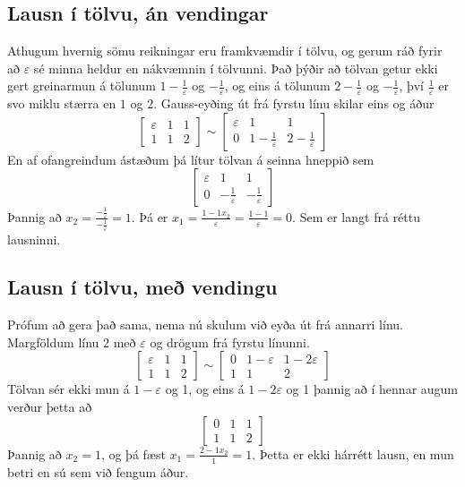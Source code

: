 \documentclass[14pt,a4paper]{article}
\renewcommand{\epsilon}{\varepsilon}
\begin{document}
\subsection*{Lausn í tölvu, án vendingar}
Athugum hvernig sömu reikningar eru framkvæmdir í tölvu, og gerum ráð 
fyrir að $\epsilon$ sé minna heldur en nákvæmnin í tölvunni. Það þýðir að tölvan
getur ekki gert greinarmun á tölunum $1-\frac 1\epsilon$ og $-\frac 1\epsilon$, og eins á 
tölunum $2-\frac 1\epsilon$ og $-\frac 1\epsilon$, því $\frac 1\epsilon$ er svo miklu
stærra en $1$ og $2$. Gauss-eyðing út frá fyrstu línu skilar eins og áður
$$
\left[
\begin{array}{ll|l}
\epsilon & 1 & 1\\
1 & 1 & 2
\end{array}\right]
\sim
\left[
\begin{array}{ll|l}
\epsilon & 1 & 1\\
0 & 1-\frac 1\epsilon & 2 -\frac 1\epsilon
\end{array}\right]
$$
En af ofangreindum ástæðum þá lítur tölvan á seinna hneppið sem
$$
\left[
\begin{array}{ll|l}
\epsilon & 1 & 1\\
0 & -\frac 1\epsilon & -\frac 1\epsilon
\end{array}\right]
$$
Þannig að $x_2 = \frac{-\frac 1\epsilon}{-\frac 1\epsilon} = 1$. 
Þá er $x_1 = \frac{1-1x_2}{\epsilon} = \frac{1-1}{\epsilon} = 0$.
Sem er langt frá réttu lausninni.

\subsection*{Lausn í tölvu, með vendingu}
Prófum að gera það sama, nema nú skulum við eyða út frá annarri línu.
Margföldum línu 2 með $\epsilon$ og drögum frá fyrstu línunni.
$$
\left[
\begin{array}{ll|l}
\epsilon & 1 & 1\\
1 & 1 & 2
\end{array}\right]
\sim
\left[
\begin{array}{ll|l}
0 & 1-\epsilon & 1-2\epsilon\\
1 & 1 & 2
\end{array}\right]
$$
Tölvan sér ekki mun á $1-\epsilon$ og 1, og eins á $1-2\epsilon$ og 1 þannig
að í hennar augum verður þetta að 
$$\left[
\begin{array}{ll|l}
0 & 1 & 1\\
1 & 1 & 2
\end{array}\right]
$$
Þannig að $x_2 = 1$, og þá fæst 
$x_1 = \frac{2-1x_2}{1} = 1$. Þetta er ekki hárrétt lausn, en mun betri en
sú sem við fengum áður.
\end{document}
